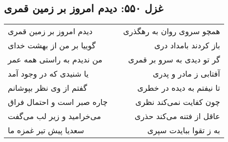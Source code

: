 \begin{center}
\section*{غزل ۵۵۰: دیدم امروز بر زمین قمری}
\label{sec:550}
\begin{longtable}{l p{0.5cm} r}
دیدم امروز بر زمین قمری
&&
همچو سروی روان به رهگذری
\\
گوییا بر من از بهشت خدای
&&
باز کردند بامداد دری
\\
من ندیدم به راستی همه عمر
&&
گر تو دیدی به سرو بر قمری
\\
یا شنیدی که در وجود آمد
&&
آفتابی ز مادر و پدری
\\
گفتم از وی نظر بپوشانم
&&
تا نیفتم به دیده در خطری
\\
چاره صبر است و احتمال فراق
&&
چون کفایت نمی‌کند نظری
\\
می‌خرامید و زیر لب می‌گفت
&&
عاقل از فتنه می‌کند حذری
\\
سعدیا پیش تیر غمزه ما
&&
به ز تقوا ببایدت سپری
\\
\end{longtable}
\end{center}
